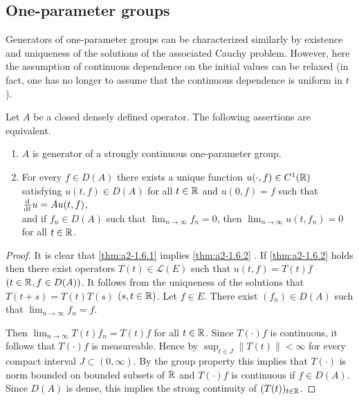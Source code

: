 \subsection{One-parameter groups} \label{subsec:a2-1.se2}%
Generators of one-parameter groups can be characterized similarly by existence and uniqueness of the solutions of the associated Cauchy problem.
However, here the assumption of continuous dependence on the initial values can be relaxed (in fact, one has no longer to assume that the continuous dependence is uniform in $t$).
\begin{theorem}\label{thm:a2-1.6}
Let $A$ be a closed densely defined operator.
The following assertions are equivalent.
\begin{enumerate}[\upshape (a)]
\item \label{thm:a2-1.6.1}
$A$ is generator of a strongly continuous one-parameter group.
\item  \label{thm:a2-1.6.2}
For every $f \in D(A)$ there exists a unique function $u(\cdot,f) \in C^{1}(\mathbb{R})$ satisfying $u(t,f) \in D(A)$ for all $t \in \mathbb{R}$ and $u(0,f) = f$ such that $\frac{\mathop{}\!\mathrm{d}{}}{\mathop{}\!\mathrm{d}{t}}u = Au(t,f)$, \\
and if $f_{n} \in D(A)$ such that $\lim_{n \to \infty} f_{n} = 0$, then $\lim_{n \to \infty} u(t,f_{n}) = 0$ for all $t \in \mathbb{R}$.
\end{enumerate}
\end{theorem}
\begin{proof}
It is clear that \ref{thm:a2-1.6.1}   implies \ref{thm:a2-1.6.2} . 
If \ref{thm:a2-1.6.2}   holds then there exist operators $T(t) \in \mathcal{L}(E)$ such that $u(t,f) = T(t)f$ $(t \in \mathbb{R}, f \in D(A))$.
It follows from the uniqueness of the solutions that $T(t+s) = T(t)T(s)$ $(s,t \in \mathbb{R})$.
Let $f \in E$. 
There exist $(f_{n}) \in D(A)$ such that $\lim_{n \to \infty} f_{n} = f$.

Then $\lim_{n \to \infty} T(t)f_{n} = T(t)f$ for all $t \in \mathbb{R}$.
Since $T(\cdot)f$ is continuous, it follows that $T(\cdot)f$ is measureable.
Hence by 
\citet[10.2.1]{hillephillips:1957} $\sup_{t \in J}\|T(t)\| < \infty$ for every compact interval $J \subset (0,\infty)$.
By the group property this implies that $T(\cdot)$ is norm bounded on bounded subsets of $\mathbb{R}$ and
$T(\cdot)f$ is continuous if $f \in D(A)$.
Since $D(A)$ is dense, this implies the strong continuity of $(T(t))_{t \in \mathbb{R}}$.
\end{proof}
